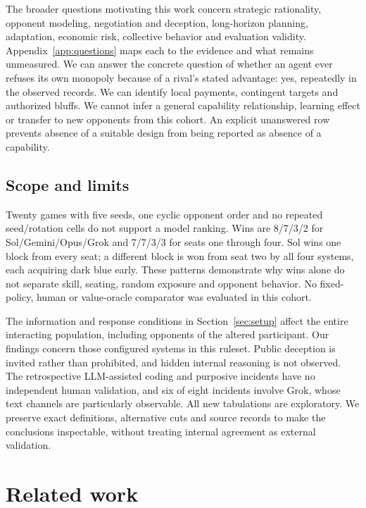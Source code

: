 The broader questions motivating this work concern strategic rationality, opponent modeling, negotiation and deception, long-horizon planning, adaptation, economic risk, collective behavior and evaluation validity. Appendix~\ref{app:questions} maps each to the evidence and what remains unmeasured. We can answer the concrete question of whether an agent ever refuses its own monopoly because of a rival's stated advantage: yes, repeatedly in the observed records. We can identify local payments, contingent targets and authorized bluffs. We cannot infer a general capability relationship, learning effect or transfer to new opponents from this cohort. An explicit unanswered row prevents absence of a suitable design from being reported as absence of a capability.

\subsection{Scope and limits}

Twenty games with five seeds, one cyclic opponent order and no repeated seed/rotation cells do not support a model ranking. Wins are 8/7/3/2 for Sol/Gemini/Opus/Grok and 7/7/3/3 for seats one through four. Sol wins one block from every seat; a different block is won from seat two by all four systems, each acquiring dark blue early. These patterns demonstrate why wins alone do not separate skill, seating, random exposure and opponent behavior. No fixed-policy, human or value-oracle comparator was evaluated in this cohort.

The information and response conditions in Section~\ref{sec:setup} affect the entire interacting population, including opponents of the altered participant. Our findings concern those configured systems in this ruleset. Public deception is invited rather than prohibited, and hidden internal reasoning is not observed. The retrospective LLM-assisted coding and purposive incidents have no independent human validation, and six of eight incidents involve Grok, whose text channels are particularly observable. All new tabulations are exploratory. We preserve exact definitions, alternative cuts and source records to make the conclusions inspectable, without treating internal agreement as external validation.

\section{Related work}

